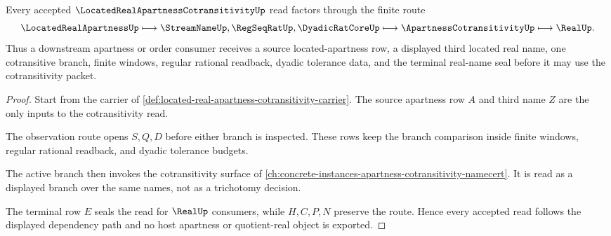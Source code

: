 \begin{theorem}
\label{thm:located-real-apartness-cotransitivity-route}
Every accepted $\LocatedRealApartnessCotransitivityUp$ read factors through the finite route
$$
\LocatedRealApartnessUp \longmapsto \StreamNameUp,\RegSeqRatUp,\DyadicRatCoreUp \longmapsto \ApartnessCotransitivityUp \longmapsto \RealUp .
$$
Thus a downstream apartness or order consumer receives a source located-apartness row, a displayed third located real name, one cotransitive branch, finite windows, regular rational readback, dyadic tolerance data, and the terminal real-name seal before it may use the cotransitivity packet.
\end{theorem}
\begin{proof}
Start from the carrier of \autoref{def:located-real-apartness-cotransitivity-carrier}. The source apartness row $A$ and third name $Z$ are the only inputs to the cotransitivity read.

The observation route opens $S,Q,D$ before either branch is inspected. These rows keep the branch comparison inside finite windows, regular rational readback, and dyadic tolerance budgets.

The active branch then invokes the cotransitivity surface of \autoref{ch:concrete-instances-apartness-cotransitivity-namecert}. It is read as a displayed branch over the same names, not as a trichotomy decision.

The terminal row $E$ seals the read for $\RealUp$ consumers, while $H,C,P,N$ preserve the route. Hence every accepted read follows the displayed dependency path and no host apartness or quotient-real object is exported.
\end{proof}


